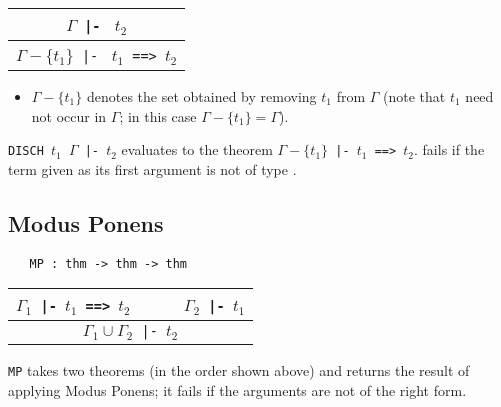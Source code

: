 \begin{center}
\begin{tabular}{c}
$\Gamma${\small\verb+ |- +} $t_2$ \\ \hline
$\Gamma{-}\{t_1\}${\small\verb+ |- +} $t_1${\small\verb+ ==> +}$t_2$
\end{tabular}
\end{center}

\begin{itemize}
\item  $\Gamma{-}\{t_1\}$ denotes the set obtained by removing $t_1$
from $\Gamma$ (note that $t_1$ need not occur in $\Gamma$; in this case
$\Gamma{-}\{t_1\} = \Gamma$).
\end{itemize}

\noindent
{\small\verb+DISCH +}$t_1${\small\verb+ +}$\Gamma${\small\verb+ |- +}$t_2$
evaluates to the theorem
$\Gamma{-}\{t_1\}${\small\verb+ |- +}$t_1${\small\verb+ ==> +}$t_2$.
 fails if the term given as its first argument is not of
type .



\bigskip

\subsection{Modus Ponens}


\begin{boxed}
\begin{verbatim}
   MP : thm -> thm -> thm
\end{verbatim}\end{boxed}

\begin{center}
\begin{tabular}{c}
$\Gamma_1${\small\verb+ |- +}$t_1${\small\verb+ ==> +}$t_2$ {\small\verb+     +} $\Gamma_2${\small\verb+ |- +}$t_1$ \\
\hline
$\Gamma_1 \cup \Gamma_2${\small\verb+ |- +}$t_2$ \\
\end{tabular}
\end{center}

\noindent
{\small\verb+MP+} takes two theorems (in the order shown above) and returns
the result of applying Modus Ponens; it fails if the arguments are not of the
right form.

